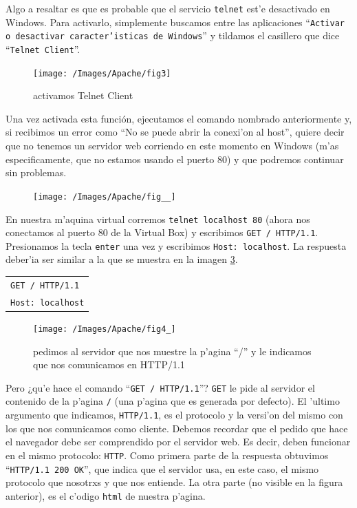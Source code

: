 \documentclass[11pt]{article}
\begin{document}
		Algo a resaltar es que es probable que el servicio \texttt{telnet} est'e desactivado en Windows. Para activarlo, simplemente buscamos entre las aplicaciones ``\texttt{Activar o desactivar caracter'isticas de Windows}'' y tildamos el casillero que dice ``\texttt{Telnet Client}''. 

		\begin{figure}[H]
  			\centering
    			\texttt{[image: /Images/Apache/fig3]}
    			\label{fig:3}
    			\caption{activamos Telnet Client}
		\end{figure}

		Una vez activada esta función, ejecutamos el comando nombrado anteriormente y, si recibimos un error como ``No se puede abrir la conexi'on al host'', quiere decir que no tenemos un servidor web corriendo en este momento en Windows (m'as especificamente, que no estamos usando el puerto 80) y que podremos continuar sin problemas.

		\begin{figure}[H]
    			\centering
    			\texttt{[image: /Images/Apache/fig\_\_]}
    			\label{fig:__}
		\end{figure}

		En nuestra m'aquina virtual corremos \texttt{telnet localhost 80} (ahora nos conectamos al puerto 80 de la Virtual Box) y escribimos \texttt{GET / HTTP/1.1}. Presionamos la tecla \texttt{enter} una vez y escribimos \texttt{Host: localhost}. La respuesta deber'ia ser similar a la que se muestra en la imagen \ref{fig:4}.

		\begin{table}[H]
    			\centering
    			\begin{tabular}{|l|}
        			\hline
        			\texttt{GET / HTTP/1.1} \\
        			\texttt{Host: localhost} \\\hline
    			\end{tabular}
    			\label{tab:my_label}
		\end{table}

		\begin{figure}[H]
    			\centering
    			\texttt{[image: /Images/Apache/fig4\_]}
    			\caption{pedimos al servidor que nos muestre la p'agina ``/'' y le indicamos que nos comunicamos en HTTP/1.1}
    			\label{fig:4}
		\end{figure}

		Pero ¿qu'e hace el comando ``\texttt{GET / HTTP/1.1}''? \texttt{GET} le pide al servidor el contenido de la p'agina \texttt{/} (una p'agina que es generada por defecto). El 'ultimo argumento que indicamos, \texttt{HTTP/1.1}, es el protocolo y la versi'on del mismo con los que nos comunicamos como cliente. 
Debemos recordar que el pedido que hace el navegador debe ser comprendido por el servidor web. Es decir, deben funcionar en el mismo protocolo: \texttt{HTTP}.
Como primera parte de la respuesta obtuvimos ``\texttt{HTTP/1.1 200 OK}'', que indica que el servidor usa, en este caso, el mismo protocolo que nosotrxs y que nos entiende. La otra parte (no visible en la figura anterior), es el c'odigo \texttt{html} de nuestra p'agina.
\end{document}
